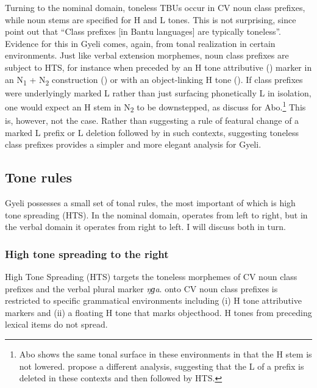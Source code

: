 Turning to the nominal domain, toneless TBUs occur in CV noun class prefixes, while noun stems are specified for H and L tones. This is not surprising, since \citet[60]{kisseberth2003} point out that ``Class prefixes [in Bantu languages] are typically toneless''. Evidence for this in Gyeli comes, again, from tonal realization in certain environments. Just like verbal extension morphemes, noun class prefixes are subject to HTS, for instance when preceded by an H tone attributive ({\ATT}) marker in an N\textsubscript{1} + N\textsubscript{2} construction () or with an object-linking H tone (). If class prefixes were underlyingly marked L rather than just surfacing phonetically L in isolation, one would expect an H stem in N\textsubscript{2} to be downstepped, as \citet[175]{hyman2012} discuss for Abo.\footnote{Abo shows the same tonal surface in these environments in that the H stem is not lowered. \citet[175]{hyman2012} propose a different analysis, suggesting that the L of a prefix is deleted in these contexts and then followed by HTS.} This is, however, not the case. Rather than suggesting a rule of featural change of a marked L prefix or L deletion followed by {\HTS} in such contexts, suggesting toneless class prefixes provides a simpler and more elegant analysis for Gyeli.






\subsection{Tone rules}
\label{sec:Trules}

Gyeli possesses a small set of tonal rules, the most important of which is high tone spreading (HTS). In the nominal domain, {\HTS} operates from left to right, but in the verbal domain it operates from right to left. I will discuss both in turn.



 \subsubsection{High tone spreading to the right}
\label{sec:HTSr}

High Tone Spreading (HTS) targets the toneless morphemes of CV noun class prefixes and the verbal plural marker {\itshape ŋɡa}.  {\HTS} onto CV noun class prefixes is restricted to specific grammatical environments including (i) H tone attributive markers and (ii) a floating H tone that marks objecthood. H tones from preceding lexical items do not spread.


